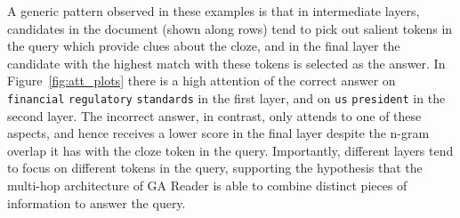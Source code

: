 \documentclass[11pt,a4paper]{article}
\begin{document}
A generic pattern observed in these examples is that in intermediate layers,
candidates in the document (shown along rows) tend to pick out salient tokens in the query which provide clues about the cloze, and in the final layer the candidate with the highest match with these tokens is selected as the answer.
In Figure~\ref{fig:att_plots} there is a high attention of the correct answer on \texttt{financial} \texttt{regulatory} \texttt{standards} in the first layer, and on \texttt{us} \texttt{president} in the second layer. The incorrect answer, in contrast, only attends to one of these aspects, and hence receives a lower score in the final layer despite the n-gram overlap it has with the cloze token in the query.
Importantly, different layers tend to focus on different tokens in the query, supporting the hypothesis that the multi-hop architecture of GA Reader is able to combine distinct pieces of information to answer the query.

\end{document}

